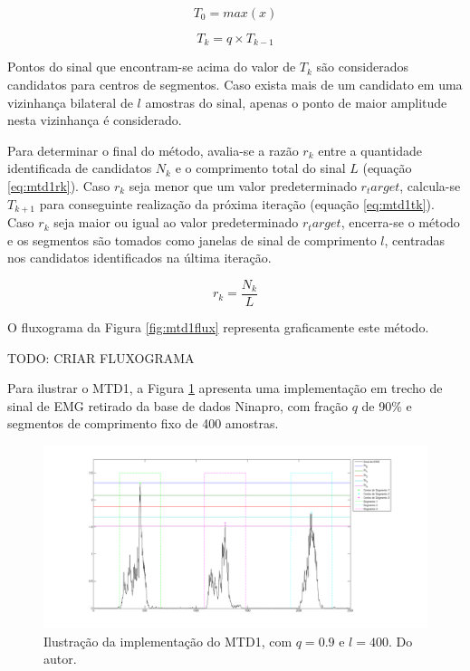 \documentclass[
	12pt,				%
	openright,			%
	oneside,
	a4paper,			%
	english,			%
	francais,			%
	spanish,			%
	brazil				%
	]{abntex2}
\begin{document}
\begin{equation}
\label{eq:mtd1t0}
  T_0 = max(x)
\end{equation}

\begin{equation}
\label{eq:mtd1t0}
  T_k = q \times T_{k-1}
\end{equation}

	Pontos do sinal que encontram-se acima do valor de $T_k$ são considerados candidatos para centros de segmentos. Caso exista mais de um candidato em uma vizinhança bilateral de $l$ amostras do sinal, apenas o ponto de maior amplitude nesta vizinhança é considerado.
	
	Para determinar o final do método, avalia-se a razão $r_k$ entre a quantidade identificada de candidatos $N_{k}$ e o comprimento total do sinal $L$ (equação \ref{eq:mtd1rk}). Caso $r_k$ seja menor que um valor predeterminado $r_target$, calcula-se $T_{k+1}$ para conseguinte realização da próxima iteração (equação \ref{eq:mtd1tk}). Caso $r_k$ seja maior ou igual ao valor predeterminado $r_target$, encerra-se o método e os segmentos são tomados como janelas de sinal de comprimento $l$, centradas nos candidatos identificados na última iteração.
	
\begin{equation}
\label{eq:mtd1rk}
  r_k = \frac{N_{k}}{L} 
\end{equation}
	
	O fluxograma da Figura \ref{fig:mtd1flux} representa graficamente este método.
	
	TODO: CRIAR FLUXOGRAMA
	
	Para ilustrar o MTD1, a Figura \ref{fig:mtd1example} apresenta uma implementação em trecho de sinal de EMG retirado da base de dados Ninapro, com fração $q$ de 90\% e segmentos de comprimento fixo de 400 amostras.
 
\begin{figure}
\centering
\includegraphics[width=0.6\linewidth]{../img/mtd1example.png}
\caption{Ilustração da implementação do MTD1, com $q = 0.9$ e $l = 400$. Do autor.}
\label{fig:mtd1example}
\end{figure}
 
\end{document}
